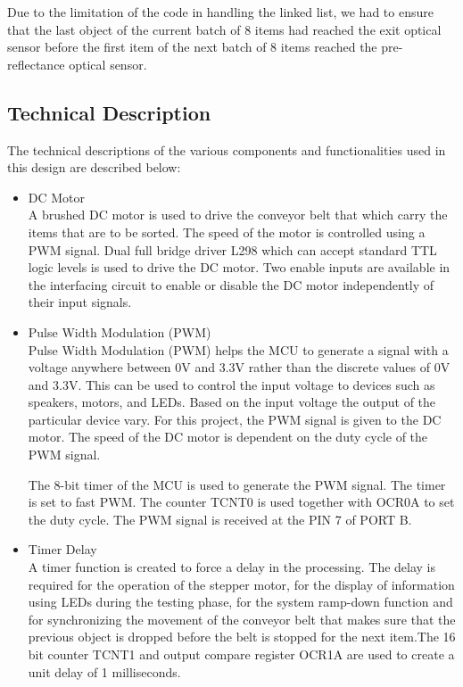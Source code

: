 Due to the limitation of the code in handling the linked list, we had to ensure that the last object of the current batch of 8 items had reached the exit optical sensor before the first item of the next batch of 8 items reached the pre-reflectance optical sensor.

\subsection{Technical Description}
The technical descriptions of the various components and functionalities used in this design are described below:
\begin{itemize}
\item DC Motor\\
A brushed DC motor is used to drive the conveyor belt that which carry the items that are to be sorted. The speed of the motor is controlled using a PWM signal. Dual full bridge driver L298 which can accept standard TTL logic levels is used to drive the DC motor. Two enable inputs are available in the interfacing circuit to enable or disable the DC motor independently of their input signals.

\item Pulse Width Modulation (PWM)\\
Pulse Width Modulation (PWM) helps the MCU to generate a signal with a voltage anywhere between 0V and 3.3V rather than the discrete values of 0V and 3.3V. This can be used to control the input voltage to devices such as speakers, motors, and LEDs. Based on the input voltage the output of the particular device vary. For this project, the PWM signal is given to the DC motor. The speed of the DC motor is dependent on the duty cycle of the PWM signal.

The 8-bit timer of the MCU is used to generate the PWM signal. The timer is set to fast PWM. The counter TCNT0 is used together with OCR0A to set the duty cycle. The PWM signal is received at the PIN 7 of PORT B.

\item Timer Delay\\
A timer function is created to force a delay in the processing. The delay is required for the operation of the stepper motor, for the display of information using LEDs during the testing phase, for the system ramp-down function and for synchronizing the movement of the conveyor belt that makes sure that the previous object is dropped before the belt is stopped for the next item.The 16 bit counter TCNT1 and output compare register OCR1A are used to create a unit delay of 1 milliseconds.


\end{itemize}
